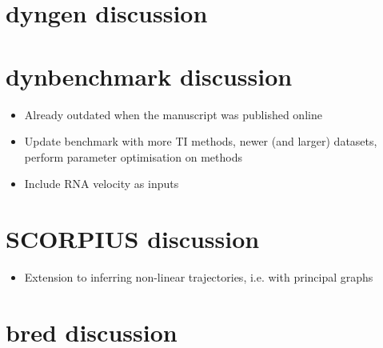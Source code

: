 %

%

\section{dyngen discussion}

\section{dynbenchmark discussion}
\begin{itemize}
	\item Already outdated when the manuscript was published online
	\item Update benchmark with more TI methods, newer (and larger) datasets, perform parameter optimisation on methods
	\item Include RNA velocity as inputs
\end{itemize}

\section{SCORPIUS discussion}
\begin{itemize}
	\item Extension to inferring non-linear trajectories, i.e. with principal graphs
\end{itemize}

\section{bred discussion}



